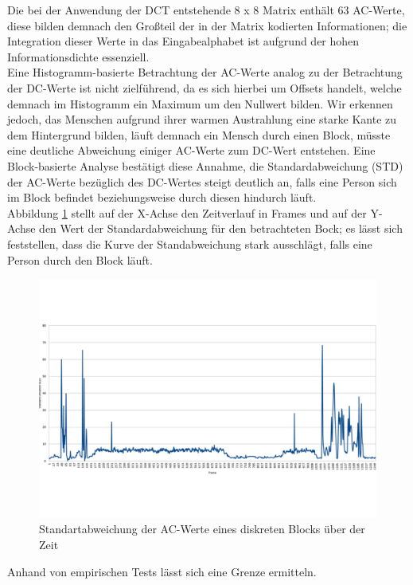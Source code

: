Die bei der Anwendung der DCT entstehende 8 x 8 Matrix enthält 63 AC-Werte, diese bilden demnach den Großteil der in der Matrix kodierten Informationen; die Integration dieser Werte in das Eingabealphabet ist aufgrund der hohen Informationsdichte essenziell.\\
Eine Histogramm-basierte Betrachtung der AC-Werte analog zu der Betrachtung der DC-Werte ist nicht zielführend, da es sich hierbei um Offsets handelt, welche demnach im Histogramm ein Maximum um den Nullwert bilden.
Wir erkennen jedoch, das Menschen aufgrund ihrer warmen Austrahlung eine starke Kante zu dem Hintergrund bilden, läuft demnach ein Mensch durch einen Block, müsste eine deutliche Abweichung einiger AC-Werte zum DC-Wert entstehen.
Eine Block-basierte Analyse bestätigt diese Annahme, die Standardabweichung (STD) der AC-Werte bezüglich des DC-Wertes steigt deutlich an, falls eine Person sich im Block befindet beziehungsweise durch diesen hindurch läuft.\\
Abbildung \ref{fig:ac_over_time} stellt auf der X-Achse den Zeitverlauf in Frames und auf der Y-Achse den Wert der Standardabweichung für den betrachteten Bock; es lässt sich feststellen, dass die Kurve der Standabweichung stark ausschlägt, falls eine Person durch den Block läuft.\\
\begin{figure}[H]
	\centering
	\includegraphics[trim=0cm 4.5cm 0cm 4cm, clip=true,width=1\textwidth]{bilder/05_AC_over_time.pdf}
	\caption{Standartabweichung der AC-Werte eines diskreten Blocks über der Zeit}
	\label{fig:ac_over_time}
\end{figure}
Anhand von empirischen Tests lässt sich eine Grenze ermitteln.
